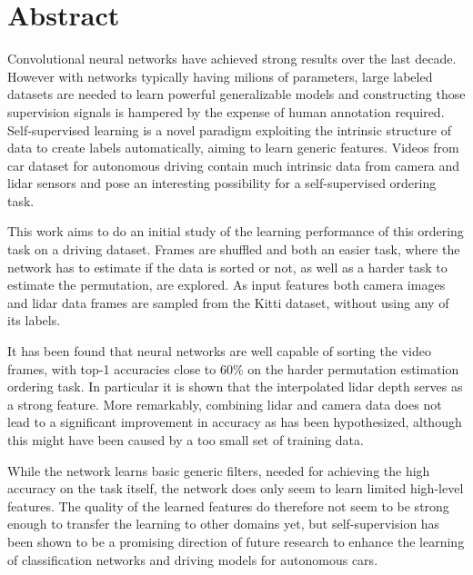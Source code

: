 %

\newpage
\vspace{3cm}

\chapter*{Abstract}
Convolutional neural networks have achieved strong results over the last decade. However with networks typically having milions of parameters, large labeled datasets are needed to learn powerful generalizable models and constructing those supervision signals is hampered by the expense of human annotation required. Self-supervised learning is a novel paradigm exploiting the intrinsic structure of data to create labels automatically, aiming to learn generic features. Videos from car dataset for autonomous driving contain much intrinsic data from camera and lidar sensors and pose an interesting possibility for a self-supervised ordering task. 

This work aims to do an initial study of the learning performance of this ordering task on a driving dataset. Frames are shuffled and both an easier task, where the network has to estimate if the data is sorted or not, as well as a harder task to estimate the permutation, are explored. As input features both camera images and lidar data frames are sampled from the Kitti dataset, without using any of its labels.

It has been found that neural networks are well capable of sorting the video frames, with top-1 accuracies close to 60\% on the harder permutation estimation ordering task. In particular it is shown that the interpolated lidar depth serves as a strong feature. More remarkably, combining lidar and camera data does not lead to a significant improvement in accuracy as has been hypothesized, although this might have been caused by a too small set of training data.

While the network learns basic generic filters, needed for achieving the high accuracy on the task itself, the network does only seem to learn limited high-level features. The quality of the learned features do therefore not seem to be strong enough to transfer the learning to other domains yet, but self-supervision has been shown to be a promising direction of future research to enhance the learning of classification networks and driving models for autonomous cars.

